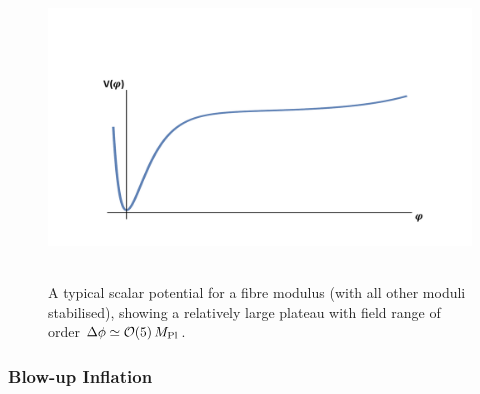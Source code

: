 \begin{figure}[t]
\begin{center}
\includegraphics[width=130mm,height=80mm]{Sections/Figures/FibrePotential.pdf} 
\caption{A typical scalar potential for a fibre modulus (with all other moduli stabilised), showing a relatively large plateau with field range of order $\Delta\phi\simeq \mathcal{O}(5)\,M_{\rm Pl}$. } 
\label{Fig:Fiber} 
\end{center}
\end{figure}


\subsubsection*{Blow-up Inflation}

